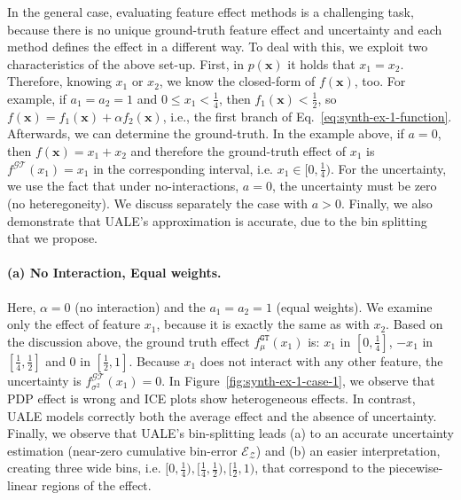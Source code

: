 \documentclass[twoside]{article}
\newcommand{\xb}{\mathbf{x}}
\begin{document}
In the general case, evaluating feature effect methods is a
challenging task, because there is no unique ground-truth feature
effect and uncertainty and each method defines the effect in a
different way. To deal with this, we exploit two characteristics of
the above set-up. First, in \(p(\xb)\) it holds that
\(x_1=x_2\). Therefore, knowing \(x_1\) or \(x_2\), we know the
closed-form of \(f(\xb)\), too. For example, if \(a_1=a_2=1\) and
\( 0 \leq x_1 < \frac{1}{4}\), then \(f_1(\xb) < \frac{1}{2}\), so
\(f(\xb) = f_1(\xb) + \alpha f_2(\xb) \), i.e., the first branch of
Eq.~\ref{eq:synth-ex-1-function}. Afterwards, we can determine the
ground-truth. In the example above, if \(a=0\), then
\(f(\xb) = x_1 + x_2\) and therefore the ground-truth effect of
\(x_1\) is \(f^{\mathcal{GT}}(x_1) = x_1\) in the corresponding
interval, i.e. \(x_1 \in [0, \frac{1}{4})\). For the uncertainty, we
use the fact that under no-interactions, \(a=0\), the uncertainty must
be zero (no heteregoneity). We discuss separately the case with
\(a>0\). Finally, we also demonstrate that UALE's approximation is
accurate, due to the bin splitting that we propose.

\paragraph{(a) No Interaction, Equal weights.}

Here, \(\alpha=0\) (no interaction) and the \(a_1=a_2=1\) (equal
weights). We examine only the effect of feature \(x_1\), because it is
exactly the same as with \(x_2\). Based on the discussion above, the
ground truth effect \(f_\mu^{\mathtt{GT}}(x_1)\) is: \(x_1\) in
\([0, \frac{1}{4}]\), \(-x_1\) in \([\frac{1}{4}, \frac{1}{2}]\) and
\(0\) in \([\frac{1}{2}, 1]\). Because \(x_1\) does not interact with
any other feature, the uncertainty is
\(f^{\mathcal{GT}}_{\sigma^2}(x_1) = 0\). In
Figure~\ref{fig:synth-ex-1-case-1}, we observe that PDP effect is
wrong and ICE plots show heterogeneous effects. In contrast, UALE
models correctly both the average effect and the absence of
uncertainty. Finally, we observe that UALE's bin-splitting leads (a)
to an accurate uncertainty estimation (near-zero cumulative bin-error
\(\mathcal{E}_{\mathcal{Z}}\)) and (b) an easier interpretation,
creating three wide bins, i.e.
\([0, \frac{1}{4}), [\frac{1}{4}, \frac{1}{2}), [\frac{1}{2}, 1)\),
that correspond to the piecewise-linear regions of the effect.
\end{document}
